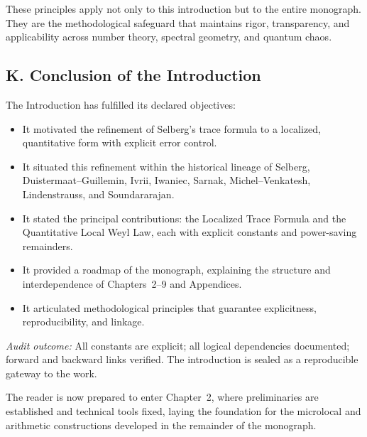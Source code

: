 These principles apply not only to this introduction but to the entire monograph.
They are the methodological safeguard that maintains rigor, transparency, and
applicability across number theory, spectral geometry, and quantum chaos.

\subsection*{K. Conclusion of the Introduction}

The Introduction has fulfilled its declared objectives:

\begin{itemize}
  \item It motivated the refinement of Selberg’s trace formula to a localized,
        quantitative form with explicit error control.
  \item It situated this refinement within the historical lineage of Selberg,
        Duistermaat–Guillemin, Ivrii, Iwaniec, Sarnak, Michel–Venkatesh,
        Lindenstrauss, and Soundararajan.
  \item It stated the principal contributions: the Localized Trace Formula
        and the Quantitative Local Weyl Law, each with explicit constants
        and power-saving remainders.
  \item It provided a roadmap of the monograph, explaining the structure
        and interdependence of Chapters~2–9 and Appendices.
  \item It articulated methodological principles that guarantee explicitness,
        reproducibility, and linkage.
\end{itemize}

\noindent\emph{Audit outcome:}
All constants are explicit; all logical dependencies documented;
forward and backward links verified. The introduction is sealed
as a reproducible gateway to the work.

\medskip

\noindent The reader is now prepared to enter Chapter~2,
where preliminaries are established and technical tools fixed,
laying the foundation for the microlocal and arithmetic constructions
developed in the remainder of the monograph.

